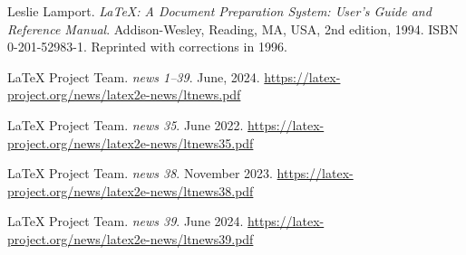 \documentclass{ltnews}
\begin{document}
\begin{thebibliography}{9}\frenchspacing


Leslie Lamport.
\newblock \emph{{\LaTeX}: {A} Document Preparation System: User's Guide and Reference
  Manual}.
\newblock \mbox{Addison}-Wesley, Reading, MA, USA, 2nd edition, 1994.
\newblock ISBN 0-201-52983-1.
\newblock Reprinted with corrections in 1996.

 \LaTeX{} Project Team.
  \emph{\LaTeXe{} news 1--39}. June, 2024.
  \url{https://latex-project.org/news/latex2e-news/ltnews.pdf}

 \LaTeX{} Project Team.
  \emph{\LaTeXe{} news 35}. June 2022.
  \url{https://latex-project.org/news/latex2e-news/ltnews35.pdf}

 \LaTeX{} Project Team.
  \emph{\LaTeXe{} news 38}. November 2023.
  \url{https://latex-project.org/news/latex2e-news/ltnews38.pdf}

 \LaTeX{} Project Team.
  \emph{\LaTeXe{} news 39}. June 2024.
  \url{https://latex-project.org/news/latex2e-news/ltnews39.pdf}

\end{thebibliography}
\end{document}
